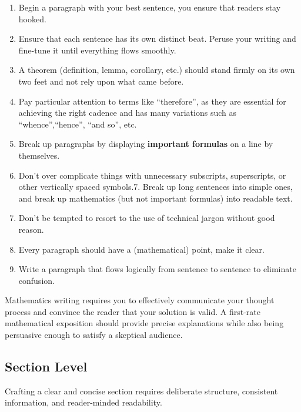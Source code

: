 \documentclass[
  twoside,
  12pt,
  letterpaper,
  fleqn]{article}
\providecommand{\tightlist}{%
  \setlength{\itemsep}{0pt}\setlength{\parskip}{0pt}}\usepackage{longtable,booktabs,array}
\begin{document}
\begin{enumerate}
\def\labelenumi{\arabic{enumi}.}
\tightlist
\item
  Begin a paragraph with your best sentence, you ensure that readers
  stay hooked.
\item
  Ensure that each sentence has its own distinct beat. Peruse your
  writing and fine-tune it until everything flows smoothly.
\item
  A theorem (definition, lemma, corollary, etc.) should stand firmly on
  its own two feet and not rely upon what came before.
\item
  Pay particular attention to terms like ``therefore'', as they are
  essential for achieving the right cadence and has many variations such
  as ``whence'',``hence'', ``and so'', etc.
\item
  Break up paragraphs by displaying \textbf{important formulas} on a
  line by themselves.
\item
  Don't over complicate things with unnecessary subscripts,
  superscripts, or other vertically spaced symbols.7. Break up long
  sentences into simple ones, and break up mathematics (but not
  important formulas) into readable text.
\item
  Don't be tempted to resort to the use of technical jargon without good
  reason.
\item
  Every paragraph should have a (mathematical) point, make it clear.
\item
  Write a paragraph that flows logically from sentence to sentence to
  eliminate confusion.
\end{enumerate}

Mathematics writing requires you to effectively communicate your thought
process and convince the reader that your solution is valid. A
first-rate mathematical exposition should provide precise explanations
while also being persuasive enough to satisfy a skeptical audience.

\hypertarget{section-level}{%
\subsection{Section Level}\label{section-level}}

Crafting a clear and concise section requires deliberate structure,
consistent information, and reader-minded readability.
\end{document}
